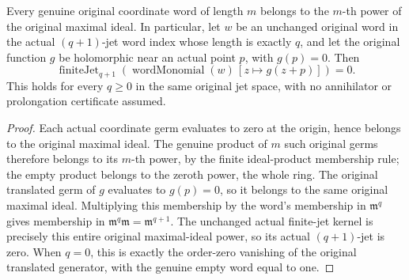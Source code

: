 \begin{theorem}
\label{hir:actual-new-maximal-word-generator-next-jet-zero}
\leanok
Every genuine original coordinate word of length $m$ belongs to the
$m$-th power of the original maximal ideal. In particular, let $w$ be
an unchanged original word in the actual $(q+1)$-jet word index whose
length is exactly $q$, and let the original function $g$ be holomorphic
near an actual point $p$, with $g(p)=0$. Then
\[
 \operatorname{finiteJet}_{q+1}
   (\operatorname{wordMonomial}(w)\,[z\mapsto g(z+p)])=0.
\]
This holds for every $q\ge0$ in the same original jet space, with no
annihilator or prolongation certificate assumed.
\end{theorem}
\begin{proof}
Each actual coordinate germ evaluates to zero at the origin, hence
belongs to the original maximal ideal. The genuine product of $m$
such original germs therefore belongs to its $m$-th power, by the
finite ideal-product membership rule; the empty product belongs to
the zeroth power, the whole ring. The original translated germ of
$g$ evaluates to $g(p)=0$, so it belongs to the same original maximal
ideal. Multiplying this membership by the word's membership in
$\mathfrak m^q$ gives membership in
$\mathfrak m^q\mathfrak m=\mathfrak m^{q+1}$. The unchanged actual
finite-jet kernel is precisely this entire original maximal-ideal
power, so its actual $(q+1)$-jet is zero. When $q=0$, this is exactly
the order-zero vanishing of the original translated generator, with
the genuine empty word equal to one.
\end{proof}
